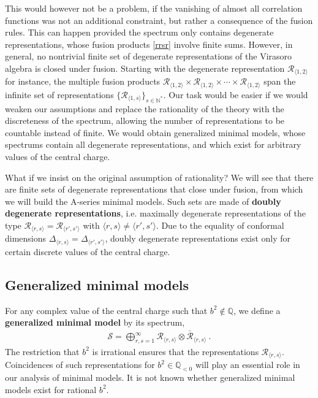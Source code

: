 \documentclass[12pt, a4paper, notitlepage, twoside]{report}
\numberwithin{equation}{section}
\theoremstyle{break}
\begin{document}
This would however not be a problem, if the vanishing of almost all correlation functions was not an additional constraint, but rather a consequence of the fusion rules.
This can happen provided the spectrum only contains degenerate representations, whose fusion products \eqref{rrsr} involve finite sums. 
However, in general, no nontrivial finite set of degenerate representations of the Virasoro algebra is closed under fusion.
Starting with the degenerate representation $\mathcal{R}_{\langle 1,2 \rangle}$ for instance, the multiple fusion products $\mathcal{R}_{\langle 1,2 \rangle}\times \mathcal{R}_{\langle 1,2 \rangle}\times \cdots \times \mathcal{R}_{\langle 1,2 \rangle}$ span the infinite set of representations $\{\mathcal{R}_{\langle 1,s \rangle}\}_{s\in{\mathbb{N}}^*}$.
Our task would be easier if we would weaken our assumptions and replace the rationality of the theory with the discreteness of the spectrum, allowing the number of representations to be countable instead of finite.
We would obtain generalized minimal models, whose spectrums contain all degenerate representations, and which exist for arbitrary values of the central charge. 

What if we insist on the original assumption of rationality? We will see that there are finite sets 
of degenerate representations that close under fusion, from which we will build the A-series minimal models.
Such sets are made of
\textbf{\boldmath doubly degenerate representations}, i.e. maximally degenerate representations of the type $\mathcal{R}_{\langle r,s \rangle}=\mathcal{R}_{\langle r',s' \rangle}$ with $\langle r,s \rangle\neq \langle r',s' \rangle$. Due to the 
equality of conformal dimensions $\Delta_{\langle r,s \rangle}=\Delta_{\langle r',s' \rangle}$, doubly degenerate representations exist only for certain discrete values of the central charge. 

\subsection{Generalized minimal models \label{secgmm}}

For any complex value of the central charge such that $b^2\notin \mathbb{Q}$, we define a \textbf{\boldmath generalized minimal model} by its spectrum,
\begin{align}
 \boxed{\mathcal{S} = \bigoplus_{r,s=1}^\infty \mathcal{R}_{\langle r,s \rangle}\otimes \bar{\mathcal{R}}_{\langle r,s \rangle}}\ .
\end{align}
The restriction that $b^2$ is irrational ensures that the representations $\mathcal{R}_{\langle r,s \rangle}$. Coincidences of such representations for $b^2\in\mathbb{Q}_{<0}$ will play an essential role in our analysis of minimal models. It is not known whether  generalized minimal models exist for rational $b^2$. 
\end{document}
